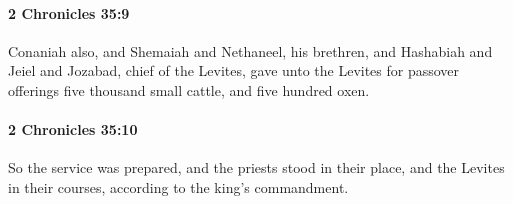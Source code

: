 		\paragraph{2 Chronicles 35:9} %
			\label{2CHRONICLES-35-9}

			Conaniah also, and Shemaiah and Nethaneel, his brethren, and Hashabiah and Jeiel and Jozabad, chief of the Levites, gave unto the Levites for passover offerings five thousand small cattle, and five hundred oxen.


		\paragraph{2 Chronicles 35:10} %
			\label{2CHRONICLES-35-10}

			So the service was prepared, and the priests stood in their place, and the Levites in their courses, according to the king's commandment.

